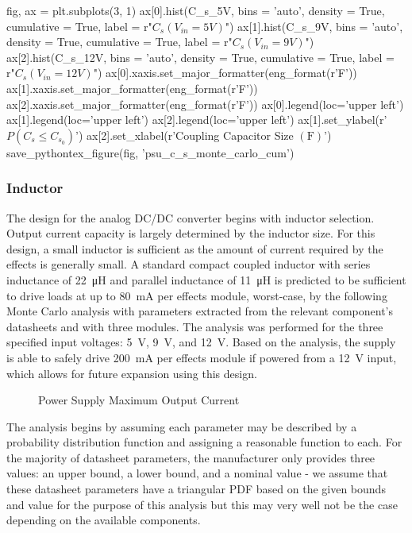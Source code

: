 \documentclass[12pt, titlepage]{tex-template}
\begin{document}
\begin{pycode}
fig, ax = plt.subplots(3, 1)
ax[0].hist(C_s_5V, bins = 'auto', density = True, cumulative = True, label = r"$C_{s}(V_{in}=5V)$")
ax[1].hist(C_s_9V, bins = 'auto', density = True, cumulative = True, label = r"$C_{s}(V_{in}=9V)$")
ax[2].hist(C_s_12V, bins = 'auto', density = True, cumulative = True, label = r"$C_{s}(V_{in}=12V)$")
ax[0].xaxis.set_major_formatter(eng_format(r'\unit{\farad}'))
ax[1].xaxis.set_major_formatter(eng_format(r'\unit{\farad}'))
ax[2].xaxis.set_major_formatter(eng_format(r'\unit{\farad}'))
ax[0].legend(loc='upper left')
ax[1].legend(loc='upper left')
ax[2].legend(loc='upper left')
ax[1].set_ylabel(r'$P\left(C_s \leq C_{s_0}\right)$')
ax[2].set_xlabel(r'Coupling Capacitor Size $\left(\unit{\farad}\right)$')
save_pythontex_figure(fig, 'psu_c_s_monte_carlo_cum')

\end{pycode}

\subsubsection{Inductor}
The design for the analog DC/DC converter begins with inductor selection. Output current capacity is largely determined by the inductor size. For this design, a small inductor is sufficient as the amount of current required by the effects is generally small. A standard compact coupled inductor with series inductance of \SI{22}{\micro\henry} and parallel inductance of \SI{11}{\micro\henry} is predicted to be sufficient to drive loads at up to \SI{80}{\milli\ampere} per effects module, worst-case, by the following Monte Carlo analysis with parameters extracted from the relevant component's datasheets and with three modules. The analysis was performed for the three specified input voltages: \SI{5}{\volt}, \SI{9}{\volt}, and \SI{12}{\volt}. Based on the analysis, the supply is able to safely drive \SI{200}{\milli\ampere} per effects module if powered from a \SI{12}{\volt} input, which allows for future expansion using this design.

\begin{figure}[!ht]
    \centering
    
    
    \caption{Power Supply Maximum Output Current}
\end{figure}

The analysis begins by assuming each parameter may be described by a probability distribution function and assigning a reasonable function to each. For the majority of datasheet parameters, the manufacturer only provides three values: an upper bound, a lower bound, and a nominal value - we assume that these datasheet parameters have a triangular PDF based on the given bounds and value for the purpose of this analysis but this may very well not be the case depending on the available components.
\end{document}
